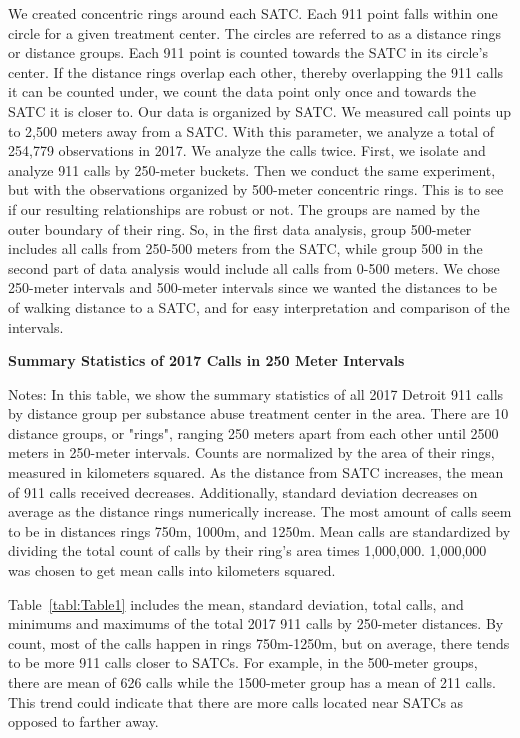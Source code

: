 \documentclass[12pt]{article}
\begin{document}
We created concentric rings around each SATC. Each 911 point falls within one circle for a given treatment center.  The circles are referred to as a distance rings or distance groups. Each 911 point is counted towards the SATC in its circle's center. If the distance rings overlap each other, thereby overlapping the 911 calls it can be counted under, we count the data point only once and towards the SATC it is closer to. Our data is organized by SATC. We measured call points up to 2,500 meters away from a SATC. With this parameter, we analyze a total of 254,779 observations in 2017. We analyze the calls twice. First, we isolate and analyze 911 calls by 250-meter buckets. Then we conduct the same experiment, but with the observations organized by 500-meter concentric rings. This is to see if our resulting relationships are robust or not. The groups are named by the outer boundary of their ring. So, in the first data analysis, group 500-meter includes all calls from 250-500 meters from the SATC, while group 500 in the second part of data analysis would include all calls from 0-500 meters. We chose 250-meter intervals and 500-meter intervals since we wanted the distances to be of walking distance to a SATC, and for easy interpretation and comparison of the intervals. 
\begin{table}[H]
\centering
\scalebox{0.8}{
\centering

}
\caption{\textbf{Summary Statistics of 2017 Calls in 250 Meter Intervals}}
\label{tabl:Table1}
\centering\small{Notes: In this table, we show the summary statistics of all 2017 Detroit 911 calls by distance group per substance abuse treatment center in the area. There are 10 distance groups, or "rings", ranging 250 meters apart from each other until 2500 meters in 250-meter intervals. Counts are normalized by the area of their rings, measured in kilometers squared. As the distance from SATC increases, the mean of 911 calls received decreases. Additionally, standard deviation decreases on average as the distance rings numerically increase. The most amount of calls seem to be in distances rings 750m, 1000m, and 1250m. Mean calls are standardized by dividing the total count of calls by their ring's area times 1,000,000. 1,000,000 was chosen to get mean calls into kilometers squared.}
\end{table}  

Table~\ref{tabl:Table1} includes the mean, standard deviation, total calls, and minimums and maximums of the total 2017 911 calls by 250-meter distances. By count, most of the calls happen in rings 750m-1250m, but on average, there tends to be more 911 calls closer to SATCs. For example, in the 500-meter groups, there are mean of 626 calls while the 1500-meter group has a mean of 211 calls. This trend could indicate that there are more calls located near SATCs as opposed to farther away. 
\end{document}
